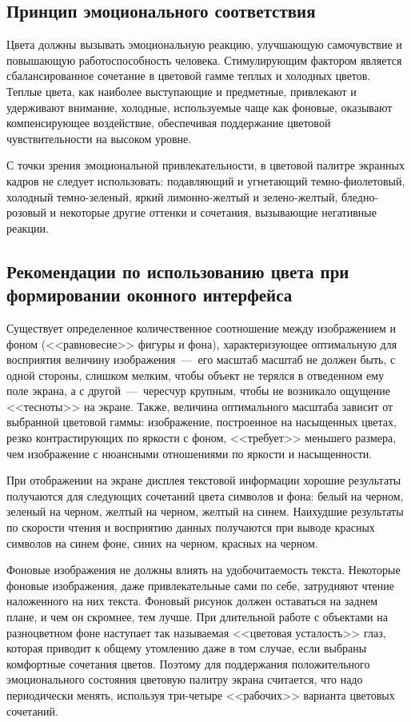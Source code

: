 \documentclass[14pt]{extarticle}
\begin{document}
\subsection{Принцип эмоционального соответствия}

Цвета должны вызывать эмоциональную реакцию, улучшающую самочувствие и повышающую работоспособность человека. Стимулирующим фактором является сбалансированное сочетание в цветовой гамме теплых и холодных цветов. Теплые цвета, как наиболее выступающие и предметные, привлекают и удерживают внимание, холодные, используемые чаще как фоновые, оказывают компенсирующее воздействие, обеспечивая поддержание цветовой чувствительности на высоком уровне.

С точки зрения эмоциональной привлекательности, в цветовой палитре экранных кадров не следует использовать: подавляющий и угнетающий темно-фиолетовый, холодный темно-зеленый, яркий лимонно-желтый и зелено-желтый, бледно-розовый и некоторые другие оттенки и сочетания, вызывающие негативные реакции.

\subsection{Рекомендации по использованию цвета при формировании оконного интерфейса}

Существует определенное количественное соотношение между изображением и фоном (<<равновесие>> фигуры и фона), характеризующее оптимальную для восприятия величину изображения~---~его масштаб масштаб не должен быть, с одной стороны, слишком мелким, чтобы объект не терялся в отведенном ему поле экрана, а с другой~---~чересчур крупным, чтобы не возникало ощущение <<тесноты>> на экране. Также, величина оптимального масштаба зависит от выбранной цветовой гаммы: изображение, построенное на насыщенных цветах, резко контрастирующих по яркости с фоном, <<требует>> меньшего размера, чем изображение с нюансными отношениями по яркости и насыщенности.

При отображении на экране дисплея текстовой информации хорошие результаты получаются для следующих сочетаний цвета символов и фона: белый на черном, зеленый на черном, желтый на черном, желтый на синем. Наихудшие результаты по скорости чтения и восприятию данных получаются при выводе красных символов на синем фоне, синих на черном, красных на черном.

Фоновые изображения не должны влиять на удобочитаемость текста. Некоторые фоновые изображения, даже привлекательные сами по себе, затрудняют чтение наложенного на них текста. Фоновый рисунок должен оставаться на заднем плане, и чем он скромнее, тем лучше. При длительной работе с объектами на разноцветном фоне наступает так называемая <<цветовая усталость>> глаз, которая приводит к общему утомлению даже в том случае, если выбраны комфортные сочетания цветов. Поэтому для поддержания положительного эмоционального состояния цветовую палитру экрана считается, что надо периодически менять, используя три-четыре <<рабочих>> варианта цветовых сочетаний.
\end{document}
